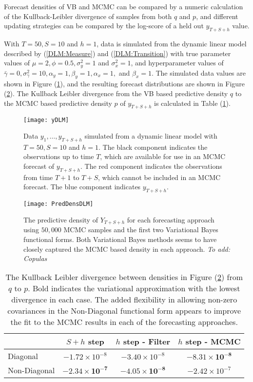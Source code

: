 \documentclass[12pt,a4paper]{article}%
\numberwithin{equation}{section}
\begin{document}
Forecast densities of VB and MCMC can be compared by a numeric calculation of the Kullback-Leibler divergence of samples from both $q$ and $p$, and different updating strategies can be compared by the log-score of a held out $y_{T+S+h}$ value. 

With $T = 50, S = 10$ and $h = 1$, data is simulated from the dynamic linear model described by (\ref{DLM:Measure}) and (\ref{DLM:Transition}) with true parameter values of $\mu = 2, \phi = 0.5, \sigma^2_y = 1$ and $\sigma^2_x = 1$, and hyperparameter values of $ \bar{\gamma} = 0, \sigma^2_{\gamma} = 10, \alpha_y = 1, \beta_y = 1, \alpha_x = 1,$ and $\beta_x = 1$. The simulated data values are shown in Figure (\ref{fig:DLMy}), and the resulting forecast distributions are shown in Figure (\ref{fig:DLMpreddens}). The Kullback Leibler divergence from the VB based predictive density $q$ to the MCMC based predictive density $p$ of $y_{T+S+h}$ is calculated in Table (\ref{Tab:KLdiv}).

\begin{figure}[h]
\centering
\texttt{[image: yDLM]}
\caption{Data $y_{1}, \dots, y_{T+S+h}$ simulated from a dynamic linear model with $T = 50, S = 10$ and $h = 1$. The black component indicates the observations up to time $T$, which are available for use in an MCMC forecast of $y_{T+S+h}$. The red component indicates the observations from time $T+1$ to $T+S$, which cannot be included in an MCMC forecast. The blue component indicates $y_{T+S+h}$.}
\label{fig:DLMy}
\end{figure}

\begin{figure}[h]
\centering
\texttt{[image: PredDensDLM]}
\caption{The predictive density of $Y_{T+S+h}$ for each forecasting approach using $50,000$ MCMC samples and the first two Variational Bayes functional forms. Both Variational Bayes methods seems to have closely captured the MCMC based density in each approach. \textit{To add: Copulas}}
\label{fig:DLMpreddens}
\end{figure}

\begin{table}
\centering
\begin{tabular}{| l | c c c |}
  \hline
  & $S+h$ step & $h$ step - Filter & $h$ step - MCMC \\
  \hline
  Diagonal & $-1.72 \times 10^{-8}$ & $-3.40 \times 10^{-8}$ & $\boldsymbol{-8.31 \times 10^{-8}} $ \\
  Non-Diagonal & $\boldsymbol{-2.34 \times 10^{-7}}$ & $\boldsymbol{-4.05 \times 10^{-8}}$ &$-2.42 \times 10^{-7} $ \\
  \hline
\end{tabular}
\caption{The Kullback Leibler divergence between densities in Figure (\ref{fig:DLMpreddens}) from $q$ to $p$. Bold indicates the variational approximation with the lowest divergence in each case. The added flexibility in allowing non-zero covariances in the Non-Diagonal functional form appears to improve the fit to the MCMC results in each of the forecasting approaches.}
\label{Tab:KLdiv}
\end{table}
\end{document}

